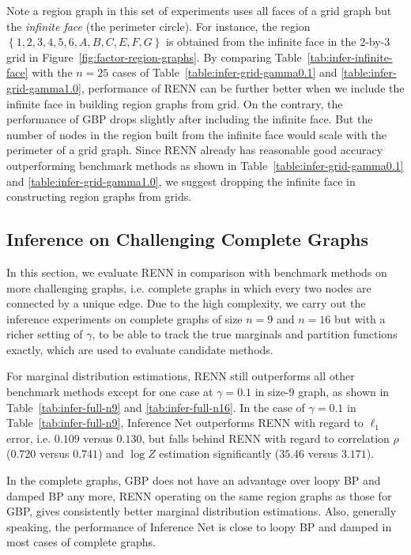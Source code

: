 \sloppy Note a region graph in this set of experiments uses all faces of a grid graph but the \textit{infinite face} (the perimeter circle). For instance, the region $\left\{1, 2, 3, 4, 5, 6, A, B, C ,E, F, G\right\}$ is obtained from the infinite face in the 2-by-3 grid in Figure~\ref{fig:factor-region-graphs}. By comparing Table~\ref{tab:infer-infinite-face} with the $n=25$ cases of Table~\ref{table:infer-grid-gamma0.1} and \ref{table:infer-grid-gamma1.0}, performance of RENN can be further better when we include the infinite face in building region graphs from grid. On the contrary, the performance of GBP drops slightly after including the infinite face. But the number of nodes in the region built from the infinite face would scale with the perimeter of a grid graph. Since RENN already has reasonable good accuracy outperforming benchmark methods as shown in Table~\ref{table:infer-grid-gamma0.1} and \ref{table:infer-grid-gamma1.0}, we suggest dropping the infinite face in constructing region graphs from grids.


\subsection{Inference on Challenging Complete Graphs}

In this section, we evaluate RENN in comparison with benchmark methods on more challenging graphs, i.e. complete graphs in which every two nodes are connected by a unique edge. Due to the high complexity, we carry out the inference experiments on complete graphs of size $n=9$ and $n=16$ but with a richer setting of $\gamma$, to be able to track the true marginals and partition functions exactly, which are used to evaluate candidate methods.

For marginal distribution estimations, RENN still outperforms all other benchmark methods except for one case at $\gamma=0.1$ in size-$9$ graph, as shown in Table~\ref{tab:infer-full-n9} and \ref{tab:infer-full-n16}. In the case of $\gamma=0.1$ in Table~\ref{tab:infer-full-n9}, Inference Net outperforms RENN with regard to $\ell_1$ error, i.e. $0.109$ versus $0.130$, but falls behind RENN with regard to correlation $\rho$ ($0.720$ versus $0.741$) and $\log{Z}$ estimation significantly ($35.46$ versus $3.171$).

In the complete graphs, GBP does not have an advantage over loopy BP and damped BP any more, RENN operating on the same region graphs as those for GBP, gives consistently better marginal distribution estimations. Also, generally speaking, the performance of Inference Net is close to loopy BP and damped in most cases of complete graphs.


